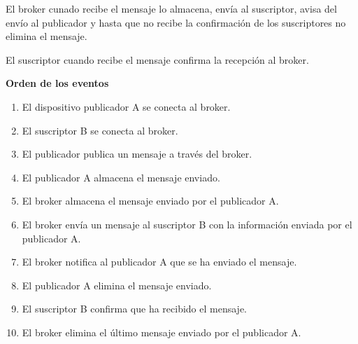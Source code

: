 \documentclass[12pt, twoside, openright]{report} %
\begin{document}
\begin{description}
	      El broker cunado recibe el mensaje lo almacena, envía al suscriptor, avisa del envío al publicador y hasta que no recibe la confirmación de los suscriptores no elimina el mensaje.

	      El suscriptor cuando recibe el mensaje confirma la recepción al broker.

	      \textbf{Orden de los eventos}
	      \begin{enumerate}
		      \item El dispositivo publicador A se conecta al broker.
		      \item El suscriptor B se conecta al broker.
		      \item El publicador publica un mensaje a través del broker.
		      \item El publicador A almacena el mensaje enviado.
		      \item El broker almacena el mensaje enviado por el publicador A.
		      \item El broker envía un mensaje al suscriptor B con la información enviada por el publicador A.
		      \item El broker notifica al publicador A que se ha enviado el mensaje.
		      \item El publicador A elimina el mensaje enviado.
		      \item El suscriptor B confirma que ha recibido el mensaje.
		      \item El broker elimina el último mensaje enviado por el publicador A.
	      \end{enumerate}


\end{description}
\end{document}
